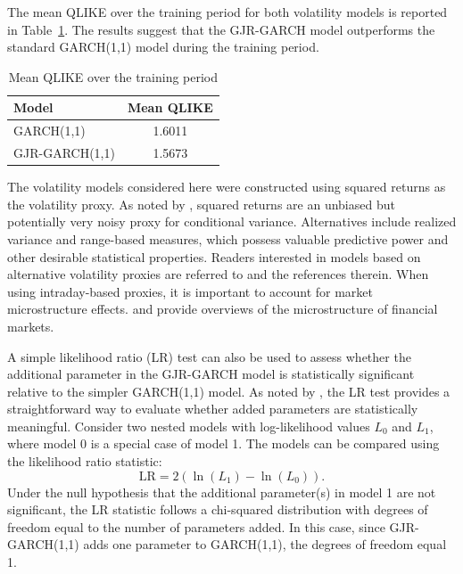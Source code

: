 The mean QLIKE over the training period for both volatility models is reported in Table~\ref{tab:4.1}. The results suggest that the GJR-GARCH model outperforms the standard GARCH(1,1) model during the training period.

\begin{table}[htbp]
\centering
\begin{tabular}{lc}
\toprule
\textbf{Model} & Mean QLIKE \\
\midrule
GARCH(1,1)&  1.6011  \\
GJR-GARCH(1,1) & 1.5673 \\
\bottomrule
\end{tabular}
\caption{Mean QLIKE over the training period}
\label{tab:4.1}
\end{table}

The volatility models considered here were constructed using squared returns as the volatility proxy. As noted by , squared returns are an unbiased but potentially very noisy proxy for conditional variance. Alternatives include realized variance and range-based measures, which possess valuable predictive power and other desirable statistical properties. Readers interested in models based on alternative volatility proxies are referred to  and the references therein. When using intraday-based proxies, it is important to account for market microstructure effects.  and  provide overviews of the microstructure of financial markets.

A simple likelihood ratio (LR) test can also be used to assess whether the additional parameter in the GJR-GARCH model is statistically significant relative to the simpler GARCH(1,1) model. As noted by , the LR test provides a straightforward way to evaluate whether added parameters are statistically meaningful.
\newpage
Consider two nested models with log-likelihood values $L_0$ and $L_1$, where model 0 is a special case of model 1. The models can be compared using the likelihood ratio statistic:
\begin{equation}
\text{LR} = 2\left( \ln(L_1) - \ln(L_0) \right).
\label{eq:4.2}
\end{equation}
Under the null hypothesis that the additional parameter(s) in model 1 are not significant, the LR statistic follows a chi-squared distribution with degrees of freedom equal to the number of parameters added. In this case, since GJR-GARCH(1,1) adds one parameter to GARCH(1,1), the degrees of freedom equal 1.


